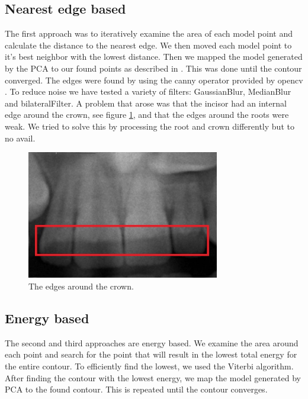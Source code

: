 \documentclass[a4paper,10pt]{article}
\begin{document}
\subsection{Nearest edge based}\label{sec:fit_edge}
The first approach was to iteratively examine the area of each model point and calculate the distance to the nearest edge. We then moved each model point to it's best neighbor with the lowest distance. Then we mapped the model generated by the PCA to our found points as described in \cite{GenerateModel}. This was done until the contour converged. The edges were found by using the canny operator provided by opencv \cite{Canny}. To reduce noise we have tested a variety of filters:  GaussianBlur, MedianBlur and bilateralFilter\cite{PythonFilters}. A problem that arose was that the incisor had an internal edge around the crown, see figure \ref{fig:InternalEdge}, and that the edges around the roots were weak. We tried to solve this by processing the root and crown differently but to no avail.


\begin{figure}[h!]
  \centering
    \includegraphics[width=0.75\textwidth]{images/internalEdge.jpg}
  \caption{The edges around the crown.}
  \label{fig:InternalEdge}
\end{figure}

\subsection{Energy based}\label{sec:fit_energy}
The second and third approaches are energy based. We examine the area around each point and search for the point that will result in the lowest total energy for the entire contour. To efficiently find the lowest, we used the Viterbi algorithm. After finding the contour with the lowest energy, we map the model generated by PCA to the found contour. This is repeated until the contour converges.
\end{document}
